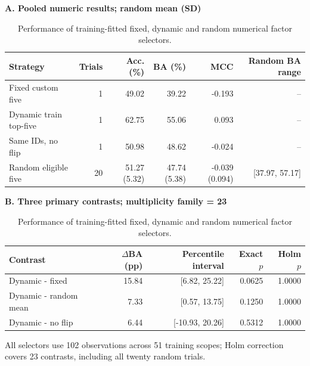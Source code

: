\begin{table}[htb]
\centering\small
\setlength{\tabcolsep}{3pt}
\renewcommand{\arraystretch}{1.15}
\caption{Performance of training-fitted fixed, dynamic and random numerical factor selectors.}
\label{tab:numeric}
\textbf{A. Pooled numeric results; random mean (SD)}\par\smallskip
\begin{tabular}{lrrrrr}
\hline
Strategy & Trials & Acc. (\%) & BA (\%) & MCC & Random BA range \\
\hline
Fixed custom five & 1 & 49.02 & 39.22 & -0.193 & -- \\
Dynamic train top-five & 1 & 62.75 & 55.06 & 0.093 & -- \\
Same IDs, no flip & 1 & 50.98 & 48.62 & -0.024 & -- \\
Random eligible five & 20 & 51.27 (5.32) & 47.74 (5.38) & -0.039 (0.094) & [37.97, 57.17] \\
\hline
\end{tabular}\par\medskip
\textbf{B. Three primary contrasts; multiplicity family = 23}\par\smallskip
\begin{tabular}{lrrrr}
\hline
Contrast & $\Delta$BA (pp) & Percentile interval & Exact $p$ & Holm $p$ \\
\hline
Dynamic - fixed & 15.84 & [6.82, 25.22] & 0.0625 & 1.0000 \\
Dynamic - random mean & 7.33 & [0.57, 13.75] & 0.1250 & 1.0000 \\
Dynamic - no flip & 6.44 & [-10.93, 20.26] & 0.5312 & 1.0000 \\
\hline
\end{tabular}\par\medskip
\begin{minipage}{\textwidth}\footnotesize All selectors use 102 observations across 51 training scopes; Holm correction covers 23 contrasts, including all twenty random trials.\end{minipage}
\end{table}

